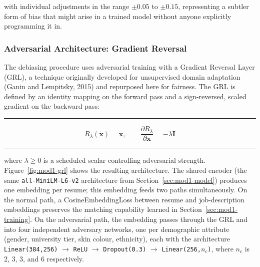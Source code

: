 \documentclass[11pt,a4paper]{article}
\newcommand{\code}[1]{\texttt{\footnotesize #1}}
\newenvironment{formulabox}
  {\begin{center}\color{TPteal}\rule{0.92\linewidth}{0.8pt}\par\vspace{5pt}\color{TPnavy}}
  {\par\vspace{3pt}\color{TPteal}\rule{0.92\linewidth}{0.8pt}\end{center}}
\begin{document}
with individual adjustments in the range $\pm0.05$ to $\pm0.15$, representing a subtler form of bias that might arise in a trained model without anyone explicitly programming it in.

\subsubsection{Adversarial Architecture: Gradient Reversal}
\label{sec:mod1-grl}

The debiasing procedure uses adversarial training with a Gradient Reversal Layer (GRL), a technique originally developed for unsupervised domain adaptation (Ganin and Lempitsky, 2015) and repurposed here for fairness. The GRL is defined by an identity mapping on the forward pass and a sign-reversed, scaled gradient on the backward pass:

\begin{formulabox}
\begin{equation}
\label{eq:grl}
R_\lambda(\mathbf{x}) = \mathbf{x}, \qquad \frac{\partial R_\lambda}{\partial \mathbf{x}} = -\lambda \mathbf{I}
\end{equation}
\end{formulabox}

where $\lambda \geq 0$ is a scheduled scalar controlling adversarial strength. Figure~\ref{fig:mod1-grl} shows the resulting architecture. The shared encoder (the same \code{all-MiniLM-L6-v2} architecture from Section~\ref{sec:mod1-model}) produces one embedding per resume; this embedding feeds two paths simultaneously. On the normal path, a CosineEmbeddingLoss between resume and job-description embeddings preserves the matching capability learned in Section~\ref{sec:mod1-training}. On the adversarial path, the embedding passes through the GRL and into four independent adversary networks, one per demographic attribute (gender, university tier, skin colour, ethnicity), each with the architecture \code{Linear(384,256)} $\to$ \code{ReLU} $\to$ \code{Dropout(0.3)} $\to$ \code{Linear(256,}$n_c$\code{)}, where $n_c$ is 2, 3, 3, and 6 respectively.
\end{document}
